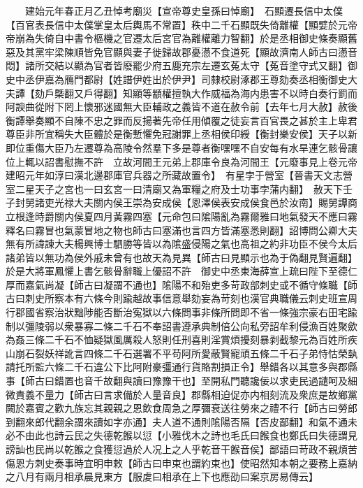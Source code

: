 　　建始元年春正月乙丑悼考廟災【宣帝尊史皇孫曰悼廟】　石顯遷長信中太僕【百官表長信中太僕掌皇太后輿馬不常置】秩中二千石顯既失倚離權【顯嬖於元帝帝崩為失倚自中書令樞機之官遷太后宮官為離權離力智翻】於是丞相御史條奏顯舊惡及其黨牢梁陳順皆免官顯與妻子徙歸故郡憂懣不食道死【顯故濟南人師古曰懣音悶】諸所交結以顯為官者皆廢罷少府五鹿充宗左遷玄菟太守【菟音塗守式又翻】御史中丞伊嘉為鴈門都尉【姓譜伊姓出於伊尹】司隸校尉涿郡王尊劾奏丞相衡御史大夫譚【劾戶槩翻又戶得翻】知顯等顓權擅執大作威福為海内患害不以時白奏行罰而阿諛曲從附下罔上懷邪迷國無大臣輔政之義皆不道在赦令前【去年七月大赦】赦後衡譚舉奏顯不自陳不忠之罪而反揚著先帝任用傾覆之徒妄言百官畏之甚於主上卑君尊臣非所宜稱失大臣體於是衡慙懼免冠謝罪上丞相侯印綬【衡封樂安侯】天子以新即位重傷大臣乃左遷尊為高陵令然羣下多是尊者衡嘿嘿不自安每有水旱連乞骸骨讓位上輒以詔書慰撫不許　立故河間王元弟上郡庫令良為河間王【元廢事見上卷元帝建昭元年如淳曰漢北邊郡庫官兵器之所藏故置令】　有星孛于營室【晉書天文志營室二星天子之宮也一曰玄宮一曰清廟又為軍糧之府及士功事孛蒲内翻】　赦天下壬子封舅諸吏光禄大夫關内侯王崇為安成侯【恩澤侯表安成侯食邑於汝南】賜舅譚商立根逢時爵關内侯夏四月黃霧四塞【元命包曰隂陽亂為霧爾雅曰地氣發天不應曰霧釋名曰霧冒也氣蒙冒地之物也師古曰塞滿也言四方皆滿塞悉則翻】詔博問公卿大夫無有所諱諫大夫楊興博士駟勝等皆以為隂盛侵陽之氣也高祖之約非功臣不侯今太后諸弟皆以無功為侯外戚未曾有也故天為見異【師古曰見顯示也為于偽翻見賢遍翻】於是大將軍鳳懼上書乞骸骨辭職上優詔不許　御史中丞東海薛宣上疏曰陛下至德仁厚而嘉氣尚凝【師古曰凝謂不通也】隂陽不和殆吏多苛政部刺史或不循守條職【師古曰刺史所察本有六條今則踰越故事信意舉劾妄為苛刻也漢官典職儀云刺史班宣周行郡國省察治狀黜陟能否斷治寃獄以六條問事非條所問即不省一條強宗豪右田宅踰制以彊陵弱以衆暴寡二條二千石不奉詔書遵承典制倍公向私旁詔牟利侵漁百姓聚歛為姦三條二千石不恤疑獄風厲殺人怒則任刑喜則淫賞煩擾刻暴剥截黎元為百姓所疾山崩石裂妖祥訛言四條二千石選署不平苟阿所愛蔽賢寵頑五條二千石子弟恃怙榮埶請托所監六條二千石違公下比阿附豪彊通行貨賂割損正令】舉錯各以其意多與郡縣事【師古曰錯置也音千故翻與讀曰豫豫干也】至開私門聽讒佞以求吏民過譴呵及細微責義不量力【師古曰言求備於人量音良】郡縣相迫促亦内相刻流及衆庶是故鄉黨闕於嘉賓之歡九族忘其親親之恩飲食周急之厚彌衰送往勞來之禮不行【師古曰勞郎到翻來郎代翻余謂來讀如字亦通】夫人道不通則隂陽否隔【否皮鄙翻】和氣不通未必不由此也詩云民之失德乾餱以愆【小雅伐木之詩也毛氏曰餱食也鄭氏曰失德謂見謗訕也民尚以乾餱之食獲愆過於人况上之人乎乾音干餱音侯】鄙語曰苛政不親煩苦傷恩方刺史奏事時宜明申敕【師古曰申束也謂約束也】使昭然知本朝之要務上嘉納之八月有兩月相承晨見東方【服䖍曰相承在上下也應劭曰案京房易傳云】

